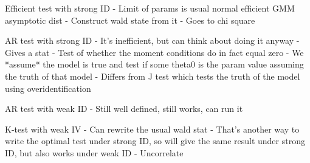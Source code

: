 \documentclass[12pt]{article}
\theoremstyle{plain}
\theoremstyle{definition}
\theoremstyle{remark}
\begin{document}
Efficient test with strong ID
- Limit of params is usual normal efficient GMM asymptotic dist
- Construct wald state from it
- Goes to chi square

AR test with strong ID
- It's inefficient, but can think about doing it anyway
- Gives a stat
- Test of whether the moment conditions do in fact equal zero
- We *assume* the model is true and test if some theta0 is the param
value assuming the truth of that model
- Differs from J test which tests the truth of the model using
overidentification

AR test with weak ID
- Still well defined, still works, can run it

K-test with weak IV
- Can rewrite the usual wald stat
- That's another way to write the optimal test under strong ID, so will
give the same result under strong ID, but also works under weak ID
- Uncorrelate
\end{document}
